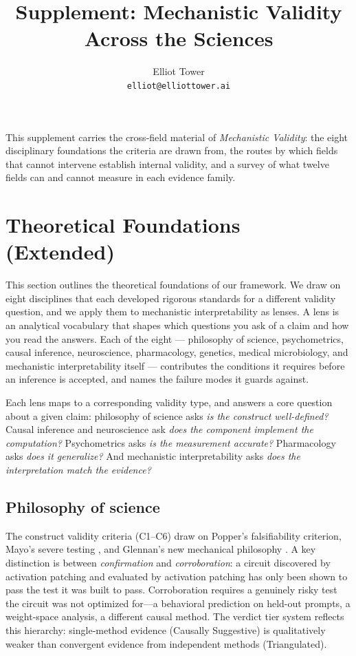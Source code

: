 \documentclass{article}
\title{Supplement: Mechanistic Validity Across the Sciences}
\author{Elliot Tower \\ \texttt{elliot@elliottower.ai}}
\date{}
\begin{document}
\maketitle

\noindent This supplement carries the cross-field material of \emph{Mechanistic
Validity}: the eight disciplinary foundations the criteria are drawn from, the
routes by which fields that cannot intervene establish internal validity, and a
survey of what twelve fields can and cannot measure in each evidence family.
\vspace{1.5em}

{\small\setlength{\parskip}{0pt}\setcounter{tocdepth}{2}\tableofcontents}
\newpage

\section{Theoretical Foundations (Extended)}
\label{app:foundations}

This section outlines the theoretical foundations of our framework. We draw on eight disciplines that each developed rigorous standards for a different validity question, and we apply them to mechanistic interpretability as lenses. A lens is an analytical vocabulary that shapes which questions you ask of a claim and how you read the answers. Each of the eight --- philosophy of science, psychometrics, causal inference, neuroscience, pharmacology, genetics, medical microbiology, and mechanistic interpretability itself --- contributes the conditions it requires before an inference is accepted, and names the failure modes it guards against.



Each lens maps to a corresponding validity type, and answers a core question about a given claim: philosophy of science asks \emph{is the construct well-defined?} Causal inference and neuroscience ask \emph{does the component implement the computation?} Psychometrics asks \emph{is the measurement accurate?} Pharmacology asks \emph{does it generalize?} And mechanistic interpretability asks \emph{does the interpretation match the evidence?}

\subsection{Philosophy of science}
\label{sec:phil-sci}

The construct validity criteria (C1--C6) draw on Popper's falsifiability criterion, Mayo's severe testing \citep{mayo2018statistical}, and Glennan's new mechanical philosophy \citep{glennan2017new}. A key distinction is between \emph{confirmation} and \emph{corroboration}: a circuit discovered by activation patching and evaluated by activation patching has only been shown to pass the test it was built to pass. Corroboration requires a genuinely risky test the circuit was not optimized for---a behavioral prediction on held-out prompts, a weight-space analysis, a different causal method. The verdict tier system reflects this hierarchy: single-method evidence (Causally Suggestive) is qualitatively weaker than convergent evidence from independent methods (Triangulated).
\end{document}
